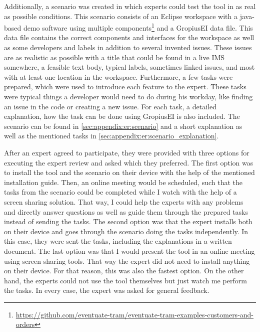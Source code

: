 Additionally, a scenario was created in which experts could test the tool in as real as possible conditions.
This scenario consists of an \gls{Eclipse} workspace with a \gls{java}-based demo software using multiple components\footnote{\url{https://github.com/eventuate-tram/eventuate-tram-examples-customers-and-orders}} and a \gls{GropiusEI} data file.
This data file contains the correct components and interfaces for the workspace as well as some developers and labels in addition to
several invented issues.
These issues are as realistic as possible with a title that could be found in a live \gls{IMS} somewhere, a feasible text body,
typical labels, sometimes linked issues, and most with at least one location in the workspace.
Furthermore, a few tasks were prepared, which were used to introduce each feature to the expert.
These tasks were typical things a developer would need to do during his workday, like finding an issue in the code or creating a new issue.
For each task, a detailed explanation, how the task can be done using \gls{GropiusEI} is also included. 
The scenario can be found in \cref{sec:appendix:er:scenario} and a short explanation as well as the mentioned tasks in \cref{sec:appendix:er:scenario_explanation}.

After an expert agreed to participate, they were provided with three options for executing the expert review and asked which they preferred.
The first option was to install the tool and the scenario on their device with the help of the mentioned installation guide.
Then, an online meeting would be scheduled, such that the tasks from the scenario could be completed while I watch with the help of a screen sharing solution. That way, I could help the experts with any problems and directly answer questions as well as guide them through the prepared tasks instead of sending the tasks.
The second option was that the expert installs both on their device and goes through the scenario doing the tasks independently.
In this case, they were sent the tasks, including the explanations in a written document.
The last option was that I would present the tool in an online meeting using screen sharing tools. 
That way the expert did not need to install anything on their device. 
For that reason, this was also the fastest option. 
On the other hand, the experts could not use the tool themselves but just watch me perform the tasks.
In every case, the expert was asked for general feedback.

